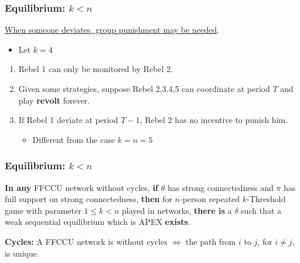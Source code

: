 \documentclass[10pt]{beamer}
\begin{document}
\begin{frame}
  \frametitle{Equilibrium: $k<n$}

\underline{When someone deviates, group punishment may be needed}.

\begin{itemize}
\item Let $k=4$
\begin{center}
\end{center}
\end{itemize}

\begin{enumerate}
\item Rebel 1 can only be monitored by Rebel 2.
\item Given some strategies, suppose Rebel 2,3,4,5 can coordinate at period $T$ and play \textbf{revolt} forever.
\item If Rebel 1 deviate at period $T-1$, Rebel 2 has no incentive to punish him.
\begin{itemize}
\item Different from the case $k=n=5$
\end{itemize}
\end{enumerate}
\end{frame}






\begin{frame}
  \frametitle{Equilibrium: $k<n$}



\begin{theorem}
\label{thm_main_result}
\textbf{In any} FFCCU network without cycles, \textbf{if} $\theta$ has strong connectedness and $\pi$ has full support on strong connectedness, \textbf{then} for $n$-person repeated $k$-Threshold game with parameter $1\leq k < n$ played in networks, \textbf{there is} a $\delta$ such that a weak sequential equilibrium which is APEX \textbf{exists}.
\end{theorem}

\begin{definition}\textbf{Cycles:}
A FFCCU network is without cycles $\Leftrightarrow$ the path from $i$ to $j$, for $i\neq j$, is unique. 
\end{definition}

\end{frame}
\end{document}
